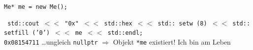 ﻿


\begin{frame}{\tt{Me* me = new Me();}}
  \begin{center}
    \Large\texttt{\color{magenta} std\color{black}::\color{orange}cout \color{black} $<<$  \color{darkgreen} "0x"{} \color{black}$<<$ \color{magenta} std\color{black}::\color{cyan}hex \color{black} $<<$ \color{magenta} std\color{black}::\color{cyan} setw\color{black} (8) $<<$ \color{magenta} std\color{black}::\color{cyan} setfill\color{black} ('0') $<<$ \color{fh-ooe-red}me \color{black} $<<$ \color{magenta}std\color{black}::\color{cyan}endl;}\\
    \vskip0.7cm
    \texttt{\color{blue}0x08154711}
    \vskip0.7cm
    \ldots ungleich \texttt{\color{brown}nullptr} $\Rightarrow$ Objekt \texttt{*me} existiert!
	\vskip0.7cm
	{\Huge \color{Mahogany}\smiley{} Ich bin am Leben \smiley}
  \end{center}
\end{frame}
